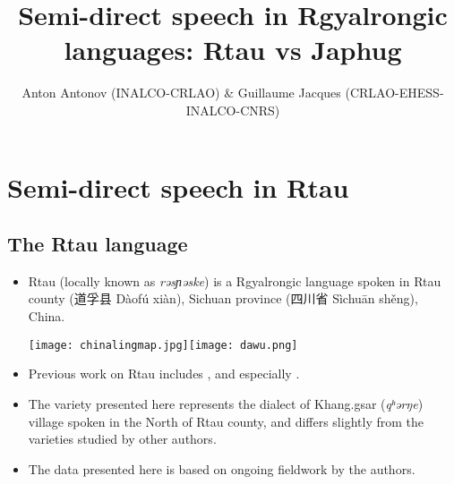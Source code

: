 \documentclass[11pt]{article}
\title{Semi-direct speech in Rgyalrongic languages: Rtau vs Japhug}
\author{Anton Antonov (INALCO-CRLAO)  \& Guillaume Jacques (CRLAO-EHESS-INALCO-CNRS)}
\newcommand{\zh}[1]{{\cn #1}}
\newcommand{\ipa}[1]{{\textit{\phon #1}}} %
\begin{document}
 
\maketitle



\section{Semi-direct speech in Rtau}

\subsection{The Rtau language}


\begin{itemize}
 \item  Rtau (locally known as \ipa{rəsɲəske}) is a Rgyalrongic language spoken in Rtau county (\zh{道孚县} Dàofú xiàn), Sichuan province (\zh{四川省} Sìchuān shěng), China.

\texttt{[image: chinalingmap.jpg]}\texttt{[image: dawu.png]}

\end{itemize}
 

\begin{itemize}
 \item Previous work on Rtau includes \citet{huangbf91daofu}, \citet{jackson07shangzhai} and especially \citet{sun13gexi}.
\item The variety presented here represents the dialect of Khang.gsar (\ipa{qʰərŋe}) village spoken in the North of Rtau county, and differs slightly from the varieties studied by other authors.

\item The  data presented here is based on ongoing fieldwork by the authors.


\end{itemize}



% 
% 
% 
\end{document}
